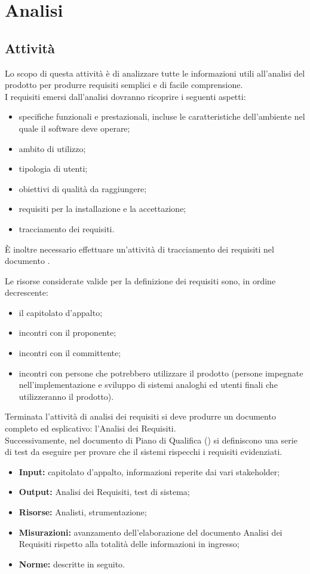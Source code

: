 \section{Analisi} {
\subsection{Attività}{
Lo scopo di questa attività è di analizzare tutte le informazioni utili all'analisi del prodotto per produrre requisiti semplici e di facile comprensione.\\
I requisiti emersi dall'analisi dovranno ricoprire i seguenti aspetti:
\begin{itemize}
	\item specifiche funzionali e prestazionali, incluse le caratteristiche dell'ambiente nel quale il software deve operare;
	\item ambito di utilizzo;
	\item tipologia di utenti;
	\item obiettivi di qualit\`a da raggiungere;
	\item requisiti per la installazione e la accettazione;
	\item tracciamento dei requisiti.
\end{itemize}
\`E inoltre necessario effettuare un'attivit\`a di tracciamento dei requisiti nel documento \textit{\SpecificaTecnica}.

Le risorse considerate valide per la definizione dei requisiti sono, in ordine decrescente:
\begin{itemize}
	\item il capitolato d'appalto;
	\item incontri con il proponente;
	\item incontri con il committente;
	\item incontri con persone che potrebbero utilizzare il prodotto (persone impegnate nell'implementazione e sviluppo di sistemi analoghi ed utenti finali che utilizzeranno il prodotto).
\end{itemize}
Terminata l'attività di analisi dei requisiti si deve produrre un documento completo ed esplicativo: l'Analisi dei Requisiti.\\
Successivamente, nel documento di Piano di Qualifica (\textit{\PianoDiQualifica}) si definiscono una serie di test da eseguire per provare che il sistemi rispecchi i requisiti evidenziati.
\begin{itemize}
	\item []{\textbf{Input:} capitolato d'appalto, informazioni reperite dai vari stakeholder;}
	\item []{\textbf{Output:} Analisi dei Requisiti, test di sistema;}
	\item []{\textbf{Risorse:} Analisti, strumentazione;}
	\item []{\textbf{Misurazioni:} avanzamento dell'elaborazione del documento Analisi dei Requisiti rispetto alla totalità delle informazioni in ingresso;}
	\item []{\textbf{Norme:} descritte in seguito.}
\end{itemize}
}

}
